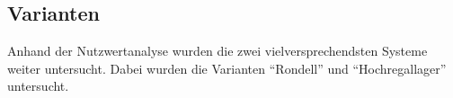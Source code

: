\subsection{Varianten}

Anhand der Nutzwertanalyse wurden die zwei vielversprechendsten Systeme weiter untersucht. Dabei wurden die Varianten \enquote{Rondell} und \enquote{Hochregallager} untersucht.




